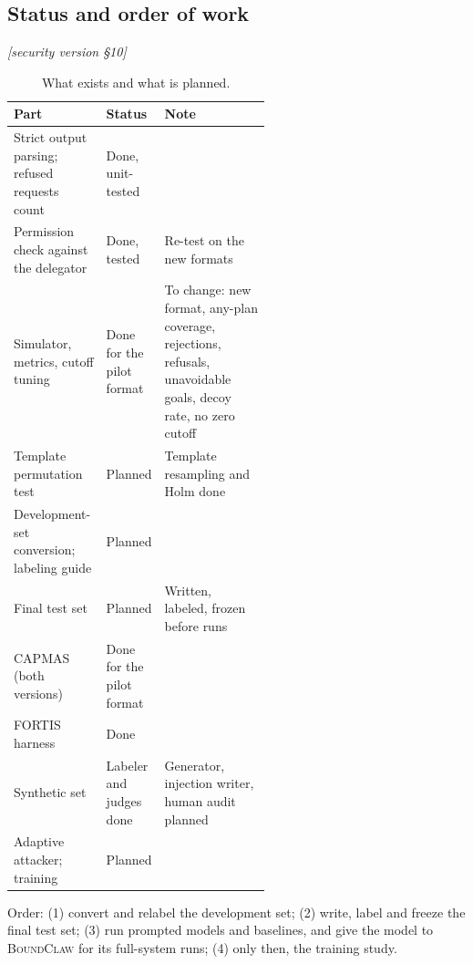 \documentclass[10pt]{article}
\newcommand{\BC}{{\mdseries\textsc{BoundClaw}}}
\newcommand{\M}[1]{\textit{[security version #1]}}
\begin{document}
\subsection{Status and order of work}
\M{\S10}
\begin{table}[H]\centering\small
\begin{tabularx}{\linewidth}{L{0.36\linewidth}L{0.2\linewidth}Y}
\toprule
Part & Status & Note \\
\midrule
Strict output parsing; refused requests count & Done, unit-tested & \\
Permission check against the delegator & Done, tested & Re-test on the new formats \\
Simulator, metrics, cutoff tuning & Done for the pilot format & To change: new format, any-plan coverage, rejections,
refusals, unavoidable goals, decoy rate, no zero cutoff \\
Template permutation test & Planned & Template resampling and Holm done \\
Development-set conversion; labeling guide & Planned & \\
Final test set & Planned & Written, labeled, frozen before runs \\
CAPMAS (both versions) & Done for the pilot format & \\
FORTIS harness & Done & \\
Synthetic set & Labeler and judges done & Generator, injection writer, human audit planned \\
Adaptive attacker; training & Planned & \\
\bottomrule
\end{tabularx}
\caption{What exists and what is planned.}
\end{table}
Order: (1) convert and relabel the development set; (2) write, label and freeze the final test set; (3) run prompted models
and baselines, and give the model to \BC{} for its full-system runs; (4) only then, the training study.
\end{document}
